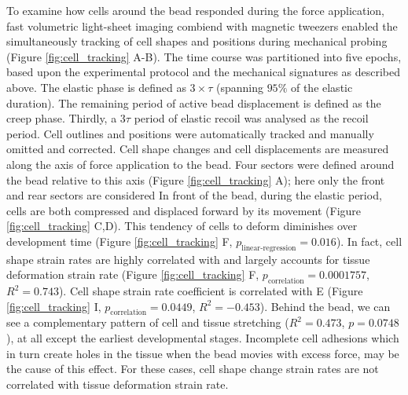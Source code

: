 To examine how cells around the bead responded during the force application, fast volumetric light-sheet imaging combiend with magnetic tweezers enabled the simultaneously tracking of cell shapes and positions during mechanical probing (Figure \ref{fig:cell_tracking} A-B).
The time course was partitioned into five epochs, based upon the experimental protocol and the mechanical signatures as described above.
The elastic phase is defined as  $3\times\tau$ %
(spanning $95\%$ of the elastic duration).
The remaining period of active bead displacement is defined as the creep phase.
Thirdly, a $3\tau$ period of elastic recoil was analysed as the recoil period.
Cell outlines and positions were automatically tracked and manually omitted and corrected.
Cell shape changes and cell displacements are measured along the axis of force application to the bead.
Four sectors were defined around the bead relative to this axis (Figure \ref{fig:cell_tracking} A); here only the front and rear sectors are considered
In front of the bead, during the elastic period, cells are both compressed and displaced forward by its movement (Figure \ref{fig:cell_tracking} C,D).
This tendency of cells to deform diminishes over development time (Figure \ref{fig:cell_tracking} F, $p_\text{linear-regression} = 0.016$).
In fact, cell shape strain rates are highly correlated with and largely accounts for tissue deformation strain rate (Figure \ref{fig:cell_tracking} F, $p_\text{correlation} = 0.0001757$, $R^2 = 0.743$).
Cell shape strain rate coefficient is correlated with E (Figure \ref{fig:cell_tracking} I, ${p_\text{correlation}} = 0.0449$, $R^2 = -0.453$).
Behind the bead, we can see a complementary pattern of cell and tissue stretching ($R^2 = 0.473$, $p = 0.0748$), at all except the earliest developmental stages.
Incomplete cell adhesions which in turn create holes in the tissue when the bead movies with excess force, may be the cause of this effect.
For these cases, cell shape change strain rates are not correlated with tissue deformation strain rate.
